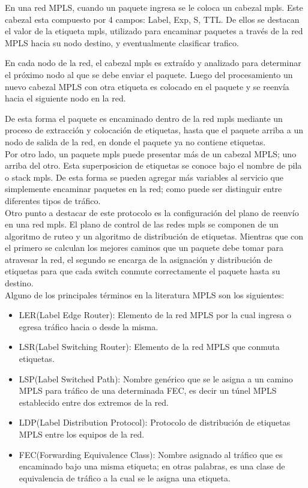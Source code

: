 En una red MPLS, cuando un paquete ingresa se le coloca un cabezal mpls. Este cabezal esta compuesto por 4 campos: Label, Exp, S, TTL. De ellos se destacan el valor de la etiqueta mpls, utilizado para encaminar paquetes a través de la red MPLS hacia su nodo destino, y eventualmente clasificar trafico.

En cada nodo de la red, el cabezal mpls es extraído y analizado para determinar el próximo nodo al que se debe enviar el paquete. Luego del procesamiento un nuevo cabezal MPLS con otra etiqueta es colocado en el paquete y se reenvía hacia el siguiente nodo en la red.

De esta forma el paquete es encaminado dentro de la red mpls mediante un proceso de extracción y colocación de etiquetas, hasta que el paquete arriba a un nodo de salida de la red, en donde el paquete ya no contiene etiquetas.\\

Por otro lado, un paquete mpls puede presentar más de un cabezal MPLS; uno arriba del otro. Esta superposicion de etiquetas se conoce bajo el nombre de pila o stack mpls. De esta forma se pueden agregar más variables al servicio que simplemente encaminar paquetes en la red; como puede ser distinguir entre diferentes tipos de tráfico.\\

Otro punto a destacar de este protocolo es la configuración del plano de reenvío en una red mpls. El plano de control de las redes mpls se componen de un algoritmo de ruteo y un algoritmo de distribución de etiquetas. Mientras que con el primero se calculan los mejores caminos que un paquete debe tomar para atravesar la red, el segundo se encarga de la asignación y distribución de etiquetas para que cada switch conmute correctamente el paquete hasta su destino.\\

Alguno de los principales términos en la literatura MPLS son los siguientes:

\begin{itemize}
\item LER(Label Edge Router): Elemento de la red MPLS por la cual ingresa o egresa tráfico hacia o desde la misma.
\item LSR(Label Switching Router): Elemento de la red MPLS que conmuta etiquetas.
\item LSP(Label Switched Path): Nombre genérico que se le asigna a un camino MPLS para tráfico de una determinada FEC, es decir un túnel MPLS establecido entre dos extremos de la red.
\item LDP(Label Distribution Protocol): Protocolo de distribución de etiquetas MPLS entre los equipos de la red.
\item FEC(Forwarding Equivalence Class): Nombre asignado al tráfico que es encaminado bajo una misma etiqueta; en otras palabras, es una clase de equivalencia de tráfico a la cual se le asigna una etiqueta.
 
\end{itemize}

